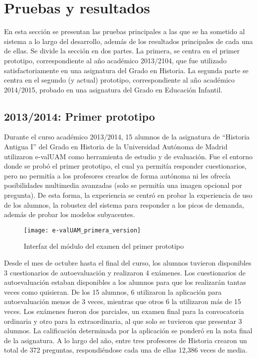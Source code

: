 \chapter{Pruebas y resultados\label{sec:pruebasYResultados}}

En esta sección se presentan las pruebas principales a las que se ha sometido al sistema a lo largo del desarrollo, además de los resultados principales de cada una de ellas. Se divide la sección en dos partes. La primera, se centra en el primer prototipo, correspondiente al año académico 2013/2104, que fue utilizado satisfactoriamente en una asignatura del Grado en Historia. La segunda parte se centra en el segundo (y actual) prototipo, correspondiente al año académico 2014/2015, probado en una asignatura del Grado en Educación Infantil.


\section{2013/2014: Primer prototipo}


Durante el curso académico 2013/2014, 15 alumnos de la asignatura de ``Historia Antigua I'' del Grado en Historia de la Universidad Autónoma de Madrid utilizaron e-valUAM como herramienta de estudio y de evaluación. Fue el entorno donde se probó el primer prototipo, el cual ya permitía responder cuestionarios, pero no permitía a los profesores crearlos de forma autónoma ni les ofrecía posibilidades multimedia avanzadas (solo se permitía una imagen opcional por pregunta). De esta forma, la experiencia se centró en probar la experiencia de uso de los alumnos, la robustez del sistema para responder a los picos de demanda, además de probar los modelos subyacentes.

\begin{figure}[htp!]
	\centering
	\texttt{[image: e-valUAM\_primera\_version]}
	\caption{Interfaz del módulo del examen del primer prototipo}
	\label{fig:e-valUAM primera version}
\end{figure}

Desde el mes de octubre hasta el final del curso, los alumnos tuvieron disponibles 3 cuestionarios de autoevaluación y realizaron 4 exámenes. Los cuestionarios de autoevaluación estaban disponibles a los alumnos para que los realizarán tantas veces como quisieran. De los 15 alumnos, 6 utilizaron la aplicación para autoevaluación menos de 3 veces, mientras que otros 6 la utilizaron más de 15 veces. Los exámenes fueron dos parciales, un examen final para la convocatoria ordinaria y otro para la extraordinaria, al que solo se tuvieron que presentar 3 alumnos. La calificación determinada por la aplicación se ponderó en la nota final de la asignatura. A lo largo del año, entre tres profesores de Historia crearon un total de 372 preguntas, respondiéndose cada una de ellas 12,386 veces de media. 

